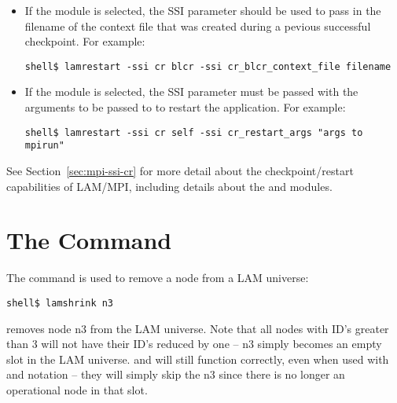 \begin{itemize}
\item If the  module is selected, the SSI parameter
   should be used to pass in
  the filename of the context file that was created during a pevious
  successful checkpoint.  For example:

\lstset{style=lam-cmdline}
\begin{lstlisting}
shell$ lamrestart -ssi cr blcr -ssi cr_blcr_context_file filename
\end{lstlisting}
  
\item If the  module is selected, the SSI parameter
   must be passed with the arguments
  to be passed to  to restart the application.  For
  example:

\lstset{style=lam-cmdline}
\begin{lstlisting}
shell$ lamrestart -ssi cr self -ssi cr_restart_args "args to mpirun"
\end{lstlisting}
\end{itemize}

See Section~\ref{sec:mpi-ssi-cr} for more detail about the
checkpoint/restart capabilities of LAM/MPI, including details about
the  and   modules.

\section{The  Command}
\label{sec:commands-lamshrink}

The  command is used to remove a node from a LAM
universe:

\lstset{style=lam-cmdline}
\begin{lstlisting}
shell$ lamshrink n3
\end{lstlisting}

\noindent removes node n3 from the LAM universe.  Note that all nodes
with ID's greater than 3 will not have their ID's reduced by one -- n3
simply becomes an empty slot in the LAM universe.   and
 will still function correctly, even when used with 
and  notation -- they will simply skip the n3 since there is no
longer an operational node in that slot.

